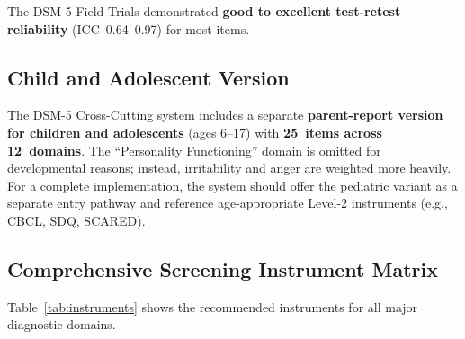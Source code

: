 \documentclass[11pt,a4paper]{article}
\begin{document}
The DSM-5 Field Trials \citep{Narrow2013} demonstrated \textbf{good to excellent test-retest reliability} (ICC~0.64--0.97) for most items.

\subsection{Child and Adolescent Version}

The DSM-5 Cross-Cutting system includes a separate \textbf{parent-report version for children and adolescents} (ages 6--17) with \textbf{25~items across 12~domains}. The ``Personality Functioning'' domain is omitted for developmental reasons; instead, irritability and anger are weighted more heavily. For a complete implementation, the system should offer the pediatric variant as a separate entry pathway and reference age-appropriate Level-2 instruments (e.g., CBCL, SDQ, SCARED).

\subsection{Comprehensive Screening Instrument Matrix}

Table~\ref{tab:instruments} shows the recommended instruments for all major diagnostic domains.
\end{document}
